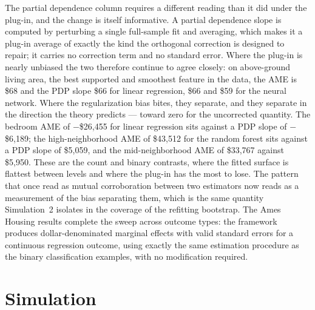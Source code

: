 \documentclass[12pt]{article}
\begin{document}
	The partial dependence column requires a different reading than it did under the plug-in, and the change is itself informative. A partial dependence slope is computed by perturbing a single full-sample fit and averaging, which makes it a plug-in average of exactly the kind the orthogonal correction is designed to repair; it carries no correction term and no standard error. Where the plug-in is nearly unbiased the two therefore continue to agree closely: on above-ground living area, the best supported and smoothest feature in the data, the AME is \$68 and the PDP slope \$66 for linear regression, \$66 and \$59 for the neural network. Where the regularization bias bites, they separate, and they separate in the direction the theory predicts --- toward zero for the uncorrected quantity. The bedroom AME of $-$\$26,455 for linear regression sits against a PDP slope of $-$\$6,189; the high-neighborhood AME of \$43,512 for the random forest sits against a PDP slope of \$5,059, and the mid-neighborhood AME of \$33,767 against \$5,950. These are the count and binary contrasts, where the fitted surface is flattest between levels and where the plug-in has the most to lose. The pattern that once read as mutual corroboration between two estimators now reads as a measurement of the bias separating them, which is the same quantity Simulation~2 isolates in the coverage of the refitting bootstrap. The Ames Housing results complete the sweep across outcome types: the framework produces dollar-denominated marginal effects with valid standard errors for a continuous regression outcome, using exactly the same estimation procedure as the binary classification examples, with no modification required.
	
	\section{Simulation}
	\label{sec:simulation}
	
\end{document}
